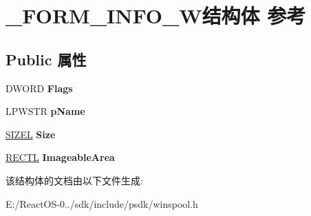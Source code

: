 \hypertarget{struct___f_o_r_m___i_n_f_o__1_w}{}\section{\+\_\+\+F\+O\+R\+M\+\_\+\+I\+N\+F\+O\+\_\+W结构体 参考}
\label{struct___f_o_r_m___i_n_f_o__1_w}
\subsection*{Public 属性}
\begin{DoxyCompactItemize}
\item 
\mbox{\label{struct___f_o_r_m___i_n_f_o__1_w_a0ee1032f408f2448665e33b150950e86}} 
D\+W\+O\+RD {\bfseries Flags}
\item 
\mbox{\label{struct___f_o_r_m___i_n_f_o__1_w_a33822ac5394551a67841136e3a3bb4d0}} 
L\+P\+W\+S\+TR {\bfseries p\+Name}
\item 
\mbox{\label{struct___f_o_r_m___i_n_f_o__1_w_a60528c45e47e147438ef69736055c88d}} 
\hyperlink{structtag_s_i_z_e}{S\+I\+Z\+EL} {\bfseries Size}
\item 
\mbox{\label{struct___f_o_r_m___i_n_f_o__1_w_a5facc8a492e45688b39a3ea905f53868}} 
\hyperlink{struct___r_e_c_t_l}{R\+E\+C\+TL} {\bfseries Imageable\+Area}
\end{DoxyCompactItemize}


该结构体的文档由以下文件生成\+:\begin{DoxyCompactItemize}
\item 
E\+:/\+React\+O\+S-\/0../sdk/include/psdk/winspool.\+h\end{DoxyCompactItemize}
